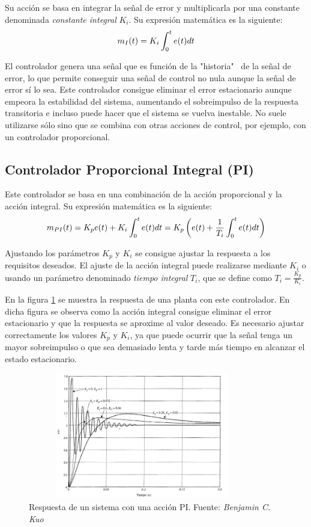 	Su acción se basa en integrar la señal de error y multiplicarla por una constante denominada \textit{constante integral} $K_{i}$. Su expresión matemática es la siguiente:
\begin{equation}\label{ecuacion2_2}
\normalsize m_{I}(t) = K_{i}\int _0^t e(t) dt
\end{equation}
	
	El controlador genera una señal que es función de la "historia"~ de la señal de error, lo que permite conseguir una señal de control no nula aunque la señal de error sí lo sea. Este controlador consigue eliminar el error estacionario aunque empeora la estabilidad del sistema, aumentando el sobreimpulso de la respuesta transitoria e incluso puede hacer que el sistema se vuelva inestable.  No suele utilizarse sólo sino que se combina con otras acciones de control, por ejemplo, con un controlador proporcional.

\subsection{Controlador Proporcional Integral (PI)}

	Este controlador se basa en una combinación de la acción proporcional y la acción integral. Su expresión matemática es la siguiente:
\begin{equation}\label{ecuacion2_3}
\normalsize m_{PI}(t) =K_{p}e(t) + K_{i}\int _0^t e(t) dt = K_{p}\left( e(t) + \frac{1}{T_{i}} \int _0^t e(t) dt\right)
\end{equation}

	Ajustando los parámetros $K_{p}$ y $K_{i}$ se consigue ajustar la respuesta a los requisitos deseados. El ajuste de la acción integral puede realizarse mediante $K_{i}$  o usando un parámetro denominado \textit{tiempo integral} $T_{i}$, que se define como $T_{i}=\frac{K_{p}}{K_{i}}$.

	En la figura \ref{fig2_3_2:PI} se muestra la respuesta de una planta con este controlador. En dicha figura se observa como la acción integral consigue eliminar el error estacionario y que la respuesta se aproxime al valor deseado. Es necesario ajustar correctamente los valores $K_{p}$ y $K_{i}$, ya que puede ocurrir que la señal tenga un mayor sobreimpulso o que sea demasiado lenta y tarde más tiempo en alcanzar el estado estacionario.

\begin{figure}[htbp]
\centering
\includegraphics[width=100mm,height=55mm]{imagenes/capitulo2/2_3_2_PI}
\caption {Respuesta de un sistema con una acción PI. Fuente: \textit{Benjamin C. Kuo} \cite{control2}}
\label{fig2_3_2:PI}
\end{figure}

